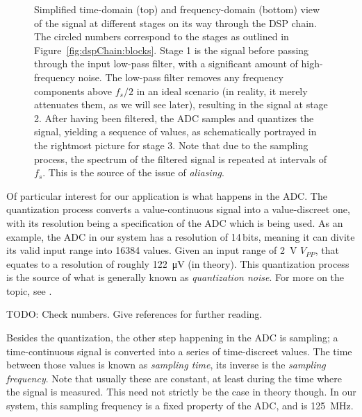\begin{figure}
    \centering
    
    
    \caption[Signals Passing Through the DSP Chain (Simplified)]{%
        Simplified  time-domain  (top)   and  frequency-domain  (bottom)  view
        of  the  signal  at  different  stages on  its  way  through  the  DSP
        chain. The circled  numbers correspond  to the  stages as  outlined in
        Figure~\ref{fig:dspChain:blocks}.\protect\newline
        Stage  1 is  the  signal  before passing  through  the input  low-pass
        filter,  with  a  significant   amount  of  high-frequency  noise. The
        low-pass filter removes any  frequency components above ${f_s}/{2}$ in
        an ideal scenario  (in reality, it merely attenuates them,  as we will
        see later), resulting in the signal at stage 2.\protect\newline
        After having been filtered, the  ADC samples and quantizes the signal,
        yielding  a sequence  of  values, as  schematically  portrayed in  the
        rightmost picture for stage 3.\protect\newline
        Note that  due to the sampling  process, the spectrum of  the filtered
        signal is  repeated at intervals of  $f_s$. This is the source  of the
        issue of \emph{aliasing}.%
    }
    \label{fig:dspChain:signals}
\end{figure}

Of particular  interest for our  application is  what happens in  the ADC. The
quantization process converts a  value-continuous signal into a value-discreet
one,  with its  resolution being  a specification  of the  ADC which  is being
used. As an example, the ADC in our system has a resolution of \num{14}\,bits,
meaning it can divite its valid  input range into \num{16384} values. Given an
input range of \SI{2}{\volt} $V_{PP}$, that equates to a resolution of roughly
\SI{122}{\micro\volt} (in theory). This quantization  process is the source of
what is generally  known as \emph{quantization noise}. For more  on the topic,
see .

TODO: Check numbers. Give references for further reading.

Besides the quantization,  the other step happening in the  ADC is sampling; a
time-continuous signal is converted into a series of time-discreet values. The
time between those values is known as \emph{sampling time}, its inverse is the
\emph{sampling  frequency}. Note that  usually  these are  constant, at  least
during the  time where the signal  is measured. This need not  strictly be the
case  in theory  though. In our  system, this  sampling frequency  is a  fixed
property of the ADC, and is \SI{125}{\mega\hertz}.

